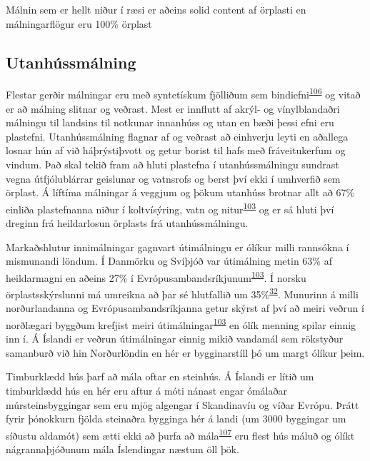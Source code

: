 \documentclass[icelandic,]{book}
\begin{document}
Málnin sem er hellt niður í ræsi er aðeins solid content af örplasti en málningarflögur eru 100\% örplast

\hypertarget{utanhussmalning}{%
\subsection*{Utanhússmálning}\label{utanhussmalning}}

Flestar gerðir málningar eru með syntetískum fjölliðum sem bindiefni\textsuperscript{\protect\hyperlink{ref-Durkin2018}{106}} og vitað er að málning slitnar og veðrast. Mest er innflutt af akrýl- og vínylblandaðri málningu til landsins til notkunar innanhúss og utan en bæði þessi efni eru plastefni. Utanhússmálning flagnar af og veðrast að einhverju leyti en aðallega losnar hún af við háþrýstiþvott og getur borist til hafs með fráveitukerfum og vindum. Það skal tekið fram að hluti plastefna í utanhússmálningu sundrast vegna útfjólublárrar geislunar og vatnsrofs og berst því ekki í umhverfið sem örplast. Á líftíma málningar á veggjum og þökum utanhúss brotnar allt að 67\% einliða plastefnanna niður í koltvísýring, vatn og nitur\textsuperscript{\protect\hyperlink{ref-Hann2018}{103}} og er sá hluti því dreginn frá heildarlosun örplasts frá utanhússmálningu.

Markaðshlutur innimálningar gagnvart útimálningu er ólíkur milli rannsókna í mismunandi löndum. Í Danmörku og Svíþjóð var útimálning metin 63\% af heildarmagni en aðeins 27\% í Evrópusambandsríkjunum\textsuperscript{\protect\hyperlink{ref-Hann2018}{103}}. Í norsku örplastsskýrslunni má umreikna að þar sé hlutfallið um 35\%\textsuperscript{\protect\hyperlink{ref-sundt2014sources}{32}}. Munurinn á milli norðurlandanna og Evrópusambandsríkjanna getur skýrst af því að meiri veðrun í norðlægari byggðum krefjist meiri útimálningar\textsuperscript{\protect\hyperlink{ref-Hann2018}{103}} en ólík menning spilar einnig inn í. Á Íslandi er veðrun útimálningar einnig mikið vandamál sem rökstyður samanburð við hin Norðurlöndin en hér er bygginarstíll þó um margt ólíkur þeim.

Timburklædd hús þarf að mála oftar en steinhús. Á Íslandi er lítið um timburklædd hús en hér eru aftur á móti nánast engar ómálaðar múrsteinsbyggingar sem eru mjög algengar í Skandinavíu og víðar Evrópu. Þrátt fyrir þónokkurn fjölda steinaðra bygginga hér á landi (um 3000 byggingar um síðustu aldamót) sem ætti ekki að þurfa að mála\textsuperscript{\protect\hyperlink{ref-Guuxf0mundsson2003}{107}} eru flest hús máluð og ólíkt nágrannaþjóðunum mála Íslendingar næstum öll þök.
\end{document}
